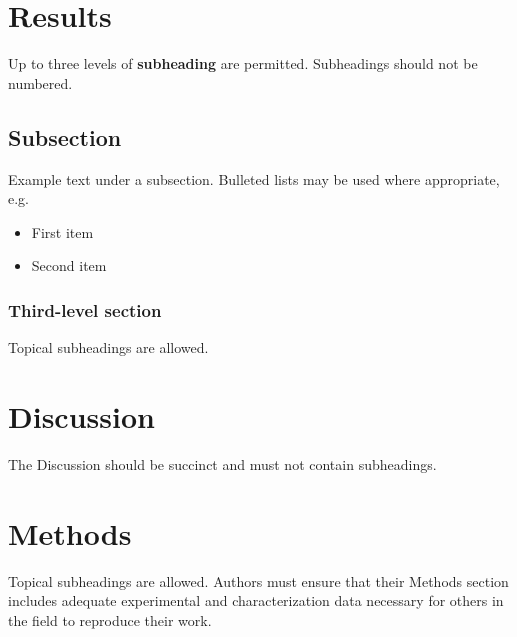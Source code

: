 \documentclass[fleqn,10pt]{wlscirep}
\begin{document}
\section*{Results}

Up to three levels of \textbf{subheading} are permitted. Subheadings should not be numbered.\par




\subsection*{Subsection}

Example text under a subsection. Bulleted lists may be used where appropriate, e.g.

\begin{itemize}
\item First item
\item Second item
\end{itemize}

\subsubsection*{Third-level section}
 
Topical subheadings are allowed.

\section*{Discussion}

The Discussion should be succinct and must not contain subheadings.

\section*{Methods}

Topical subheadings are allowed. Authors must ensure that their Methods section includes adequate experimental and characterization data necessary for others in the field to reproduce their work.




\end{document}
